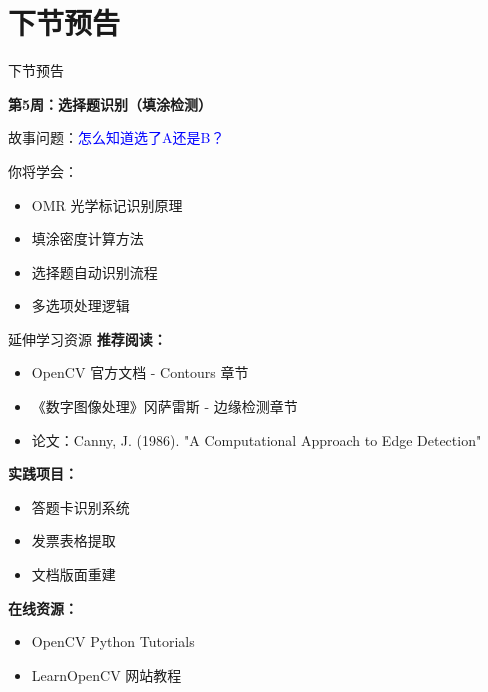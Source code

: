 \section{下节预告}

\begin{frame}{下节预告}
    \begin{center}
        \Large \textbf{第5周：选择题识别（填涂检测）}

        \vspace{0.5cm}

        \normalsize
        故事问题：\textcolor{blue}{怎么知道选了A还是B？}

        \vspace{0.3cm}

        你将学会：
        \begin{itemize}
            \item OMR 光学标记识别原理
            \item 填涂密度计算方法
            \item 选择题自动识别流程
            \item 多选项处理逻辑
        \end{itemize}
    \end{center}
\end{frame}

\begin{frame}{延伸学习资源}
    \textbf{推荐阅读：}
    \begin{itemize}
        \item OpenCV 官方文档 - Contours 章节
        \item 《数字图像处理》冈萨雷斯 - 边缘检测章节
        \item 论文：Canny, J. (1986). "A Computational Approach to Edge Detection"
    \end{itemize}

    \vspace{0.3cm}

    \textbf{实践项目：}
    \begin{itemize}
        \item 答题卡识别系统
        \item 发票表格提取
        \item 文档版面重建
    \end{itemize}

    \vspace{0.3cm}

    \textbf{在线资源：}
    \begin{itemize}
        \item OpenCV Python Tutorials
        \item LearnOpenCV 网站教程
    \end{itemize}
\end{frame}

